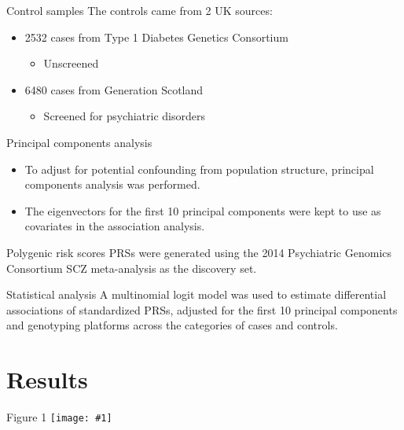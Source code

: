 \documentclass{beamer}
\newcommand*{\solo}[1]{\centering\texttt{[image: \#1]}}
\begin{document}
\begin{frame}{Control samples}
    The controls came from 2 UK sources:
    \begin{itemize}
        \item 2532 cases from Type 1 Diabetes Genetics Consortium
            \begin{itemize}
                \item Unscreened
            \end{itemize}
        \item 6480 cases from Generation Scotland
            \begin{itemize}
                \item Screened for psychiatric disorders
            \end{itemize}
    \end{itemize}
\end{frame}

\begin{frame}{Principal components analysis}
    \begin{itemize}
        \item To adjust for potential confounding from population structure, principal components analysis was performed.
        \item The eigenvectors for the first 10 principal components were kept to use as covariates in the association analysis.
    \end{itemize}
\end{frame}

\begin{frame}{Polygenic risk scores}
    PRSs were generated using the 2014 Psychiatric Genomics Consortium SCZ
    meta-analysis as the discovery set.
\end{frame}

\begin{frame}{Statistical analysis}
    A multinomial logit model was used to estimate differential associations of
    standardized PRSs, adjusted for the first 10 principal components and
    genotyping platforms across the categories of cases and controls.
\end{frame}

\section{Results}
\begin{frame}{Figure 1}
    \solo{F1.eps}
\end{frame}
\end{document}
